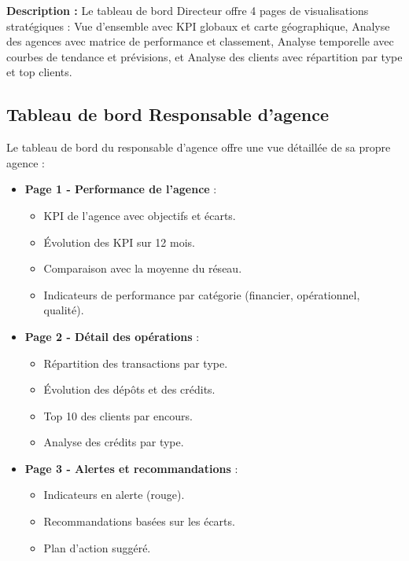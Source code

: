 \textbf{Description :} Le tableau de bord Directeur offre 4 pages de visualisations stratégiques : Vue d'ensemble avec KPI globaux et carte géographique, Analyse des agences avec matrice de performance et classement, Analyse temporelle avec courbes de tendance et prévisions, et Analyse des clients avec répartition par type et top clients.

\subsection{Tableau de bord Responsable d'agence}

Le tableau de bord du responsable d'agence offre une vue détaillée de sa propre agence :

\begin{itemize}
    \item \textbf{Page 1 - Performance de l'agence} :
        \begin{itemize}
            \item KPI de l'agence avec objectifs et écarts.
            \item Évolution des KPI sur 12 mois.
            \item Comparaison avec la moyenne du réseau.
            \item Indicateurs de performance par catégorie (financier, opérationnel, qualité).
        \end{itemize}
    \item \textbf{Page 2 - Détail des opérations} :
        \begin{itemize}
            \item Répartition des transactions par type.
            \item Évolution des dépôts et des crédits.
            \item Top 10 des clients par encours.
            \item Analyse des crédits par type.
        \end{itemize}
    \item \textbf{Page 3 - Alertes et recommandations} :
        \begin{itemize}
            \item Indicateurs en alerte (rouge).
            \item Recommandations basées sur les écarts.
            \item Plan d'action suggéré.
        \end{itemize}
\end{itemize}

